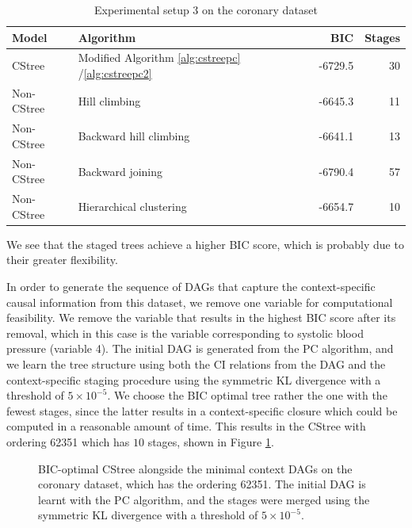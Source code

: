\documentclass{tufte-book}
\begin{document}
\begin{table}[htbp]
\caption{\label{tab:org6769764}Experimental setup 3 on the coronary dataset}
\centering
\begin{tabular}{l|l|r|r}
\hline
Model & Algorithm & BIC & Stages\\
\hline
CStree & Modified Algorithm \ref{alg:cstreepc} /\ref{alg:cstreepc2} & -6729.5 & 30\\
Non-CStree & Hill climbing & -6645.3 & 11\\
Non-CStree & Backward hill climbing & -6641.1 & 13\\
Non-CStree & Backward joining & -6790.4 & 57\\
Non-CStree & Hierarchical clustering & -6654.7 & 10\\
\end{tabular}
\end{table}



We see that the staged trees achieve a higher BIC score, which is probably due to their greater flexibility.


In order to generate the sequence of DAGs that capture the context-specific causal information from this dataset, we remove one variable for computational feasibility. We remove the variable that results in the highest BIC score after its removal, which in this case is the variable corresponding to systolic blood pressure (variable 4). The initial DAG is generated from the PC algorithm, and we learn the tree structure using both the CI relations from the DAG and the context-specific staging procedure using the symmetric KL divergence with a threshold of \(5\times 10^{-5}\). We choose the BIC optimal tree rather the one with the fewest stages, since the latter results in a context-specific closure which could be computed in a reasonable amount of time.  This results in the CStree with ordering 62351 which has \(10\) stages, shown in Figure \ref{fig:coronary_wout4}. 


\begin{figure}[!h]\label{fig:coronary_wout4}
   \begin{floatrow}
%
\caption{BIC-optimal CStree alongside the minimal context DAGs on the coronary dataset, which has the ordering 62351. The initial DAG is learnt with the PC algorithm, and the stages were merged using the symmetric KL divergence with a threshold of $5\times 10^{-5}$. }
        
   \end{floatrow}
\end{figure}
\end{document}
